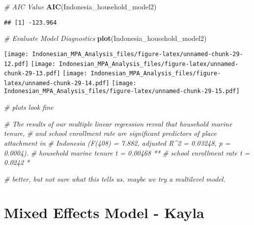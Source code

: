 \documentclass[
]{article}
\newenvironment{Shaded}{\begin{snugshade}}{\end{snugshade}}
\newcommand{\CommentTok}[1]{\textcolor[rgb]{0.56,0.35,0.01}{\textit{#1}}}
\newcommand{\FunctionTok}[1]{\textcolor[rgb]{0.13,0.29,0.53}{\textbf{#1}}}
\newcommand{\NormalTok}[1]{#1}
\begin{document}
\begin{Shaded}
\begin{Highlighting}[]
\CommentTok{\# AIC Value}
\FunctionTok{AIC}\NormalTok{(Indonesia\_household\_model2)}
\end{Highlighting}
\end{Shaded}

\begin{verbatim}
## [1] -123.964
\end{verbatim}

\begin{Shaded}
\begin{Highlighting}[]
\CommentTok{\# Evaluate Model Diagnostics}
\FunctionTok{plot}\NormalTok{(Indonesia\_household\_model2)}
\end{Highlighting}
\end{Shaded}

\texttt{[image: Indonesian\_MPA\_Analysis\_files/figure-latex/unnamed-chunk-29-12.pdf]}
\texttt{[image: Indonesian\_MPA\_Analysis\_files/figure-latex/unnamed-chunk-29-13.pdf]}
\texttt{[image: Indonesian\_MPA\_Analysis\_files/figure-latex/unnamed-chunk-29-14.pdf]}
\texttt{[image: Indonesian\_MPA\_Analysis\_files/figure-latex/unnamed-chunk-29-15.pdf]}

\begin{Shaded}
\begin{Highlighting}[]
\CommentTok{\# plots look fine}

\CommentTok{\# The results of our multiple linear regression reveal that household marine tenure, }
\CommentTok{\# and school enrollment rate are significant predictors of place attachment in }
\CommentTok{\# Indonesia (F(408) = 7.882, adjusted R\^{}2 = 0.03248, p = 0.0004). }
\CommentTok{\# household marine tenure t = 0.00468 **}
\CommentTok{\# school enrollment rate t  = 0.0242 *}

\CommentTok{\# better, but not sure what this tells us. maybe we try a multilevel model. }
\end{Highlighting}
\end{Shaded}

\section{Mixed Effects Model - Kayla}\label{mixed-effects-model---kayla}
\end{document}
